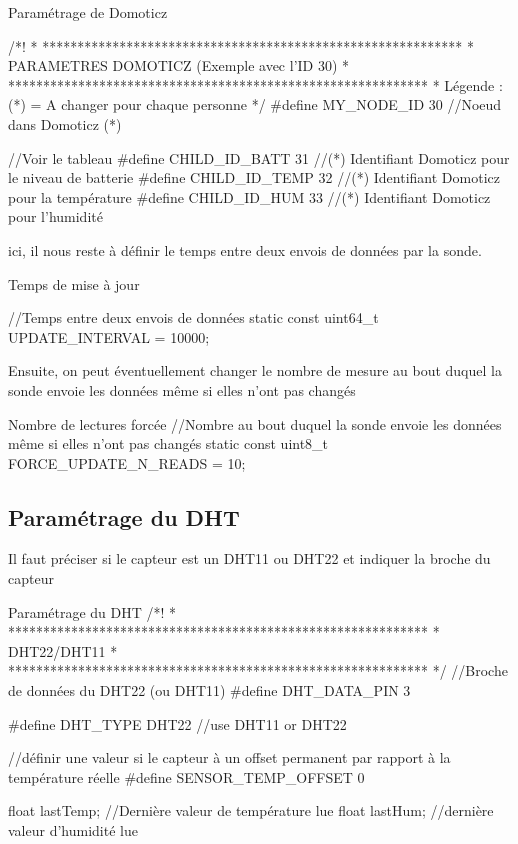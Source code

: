 \begin{Cpp}{Paramétrage de Domoticz}

/*!
 * ************************************************************
 * PARAMETRES DOMOTICZ (Exemple avec l'ID 30)
 * ************************************************************
 * Légende : (*) = A changer pour chaque personne
 */
#define MY_NODE_ID 30         //Noeud dans Domoticz (*)

//Voir le tableau
#define CHILD_ID_BATT 31      //(*) Identifiant Domoticz pour le niveau de batterie 
#define CHILD_ID_TEMP 32      //(*) Identifiant Domoticz pour la température
#define CHILD_ID_HUM 33       //(*) Identifiant Domoticz pour l'humidité

\end{Cpp}

ici, il nous reste à définir le temps entre deux envois de données par la sonde.

\begin{Cpp}{Temps de mise à jour}

//Temps entre deux envois de données
static const uint64_t UPDATE_INTERVAL = 10000;   
\end{Cpp}

Ensuite, on peut éventuellement changer le nombre de mesure au bout duquel la sonde envoie les données même si elles n'ont pas changés

\begin{Cpp}{Nombre de lectures forcée}
    //Nombre au bout duquel la sonde envoie les données même si elles n'ont pas changés
    static const uint8_t FORCE_UPDATE_N_READS = 10;
\end{Cpp}



\subsection{Paramétrage du DHT}

Il faut préciser si le capteur est un DHT11 ou DHT22 et indiquer la broche du capteur

\begin{Cpp}{Paramétrage du DHT}
    /*!
    * ************************************************************
    * DHT22/DHT11
    * ************************************************************
    */
   //Broche de données du DHT22 (ou DHT11)
   #define DHT_DATA_PIN 3
   
   #define DHT_TYPE DHT22 //use DHT11 or DHT22
   
   //définir une valeur si le capteur à un offset permanent par rapport à la température réelle
   #define SENSOR_TEMP_OFFSET 0
   
   float lastTemp;   //Dernière valeur de température lue
   float lastHum;    //dernière valeur d'humidité lue
   
\end{Cpp}


